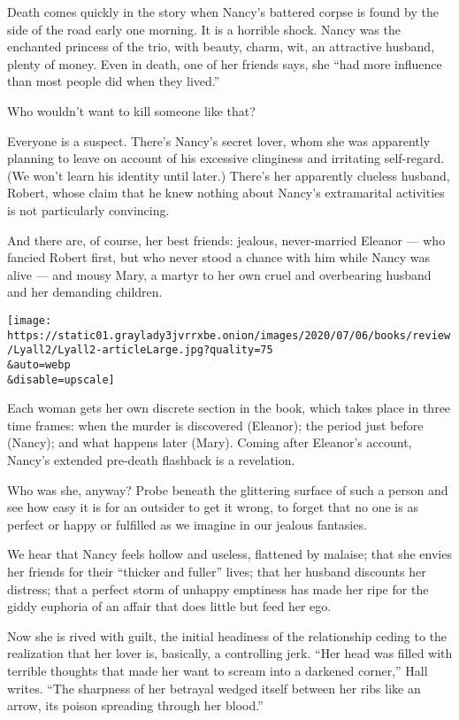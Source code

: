 Death comes quickly in the story when Nancy's battered corpse is found
by the side of the road early one morning. It is a horrible shock. Nancy
was the enchanted princess of the trio, with beauty, charm, wit, an
attractive husband, plenty of money. Even in death, one of her friends
says, she ``had more influence than most people did when they lived.''

Who wouldn't want to kill someone like that?

Everyone is a suspect. There's Nancy's secret lover, whom she was
apparently planning to leave on account of his excessive clinginess and
irritating self-regard. (We won't learn his identity until later.)
There's her apparently clueless husband, Robert, whose claim that he
knew nothing about Nancy's extramarital activities is not particularly
convincing.

And there are, of course, her best friends: jealous, never-married
Eleanor --- who fancied Robert first, but who never stood a chance with
him while Nancy was alive --- and mousy Mary, a martyr to her own cruel
and overbearing husband and her demanding children.

\texttt{[image: https://static01.graylady3jvrrxbe.onion/images/2020/07/06/books/review/Lyall2/Lyall2-articleLarge.jpg?quality=75\\\&auto=webp\\\&disable=upscale]}

Each woman gets her own discrete section in the book, which takes place
in three time frames: when the murder is discovered (Eleanor); the
period just before (Nancy); and what happens later (Mary). Coming after
Eleanor's account, Nancy's extended pre-death flashback is a revelation.

Who was she, anyway? Probe beneath the glittering surface of such a
person and see how easy it is for an outsider to get it wrong, to forget
that no one is as perfect or happy or fulfilled as we imagine in our
jealous fantasies.

We hear that Nancy feels hollow and useless, flattened by malaise; that
she envies her friends for their ``thicker and fuller'' lives; that her
husband discounts her distress; that a perfect storm of unhappy
emptiness has made her ripe for the giddy euphoria of an affair that
does little but feed her ego.

Now she is rived with guilt, the initial headiness of the relationship
ceding to the realization that her lover is, basically, a controlling
jerk. ``Her head was filled with terrible thoughts that made her want to
scream into a darkened corner,'' Hall writes. ``The sharpness of her
betrayal wedged itself between her ribs like an arrow, its poison
spreading through her blood.''

